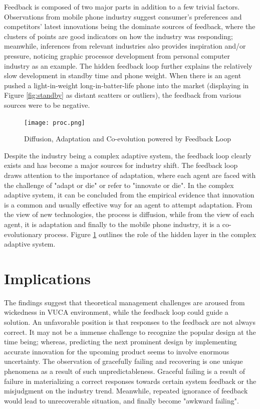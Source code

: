 \documentclass[utf8,english]{gradu3}
\begin{document}
Feedback is composed of two major parts in addition to a few trivial factors. Observations from mobile phone industry suggest consumer's preferences and competitors' latest innovations being the dominate sources of feedback, where the clusters of points are good indicators on how the industry was responding; meanwhile, inferences from relevant industries also provides inspiration and/or pressure, noticing graphic processor development from personal computer industry as an example. The hidden feedback loop further explains the relatively slow development in standby time and phone weight. When there is an agent pushed a light-in-weight long-in-batter-life phone into the market (displaying in Figure \ref{fig:standby} as distant scatters or outliers), the feedback from various sources were to be negative. 

\begin{figure}[htb]
    \centering
    \texttt{[image: proc.png]}
    \caption{Diffusion, Adaptation and Co-evolution powered by Feedback Loop}
    \label{fig:proc}
\end{figure}

Despite the industry being a complex adaptive system, the feedback loop clearly exists and has become a major sources for industry shift. The feedback loop draws attention to the importance of adaptation, where each agent are faced with the challenge of "adapt or die" or refer to "innovate or die". In the complex adaptive system, it can be concluded from the empirical evidence that innovation is a common and usually effective way for an agent to attempt adaptation. From the view of new technologies, the process is diffusion, while from the view of each agent, it is adaptation and finally to the mobile phone industry, it is a co-evolutionary process. Figure \ref{fig:proc} outlines the role of the hidden layer in the complex adaptive system.

\chapter{Implications}

The findings suggest that theoretical management challenges are aroused from wickedness in VUCA environment, while the feedback loop could guide a solution. An unfavorable position is that responses to the feedback are not always correct. It may not be a immense challenge to recognize the popular design at the time being; whereas, predicting the next prominent design by implementing accurate innovation for the upcoming product seems to involve enormous uncertainty. The observation of gracefully failing and recovering is one unique phenomena as a result of such unpredictableness. Graceful failing is a result of failure in materializing a correct responses towards certain system feedback or the misjudgment on the industry trend. Meanwhile, repeated ignorance of feedback would lead to unrecoverable situation, and finally become "awkward failing".
\end{document}
